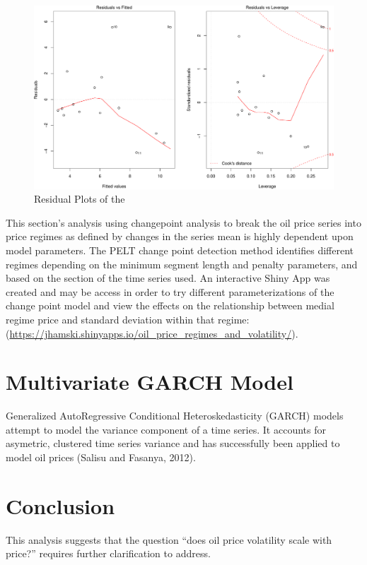 \documentclass[]{article}
\begin{document}
\begin{figure}[htbp]
\centering
\includegraphics{Figs/unnamed-chunk-18-1.pdf}
\caption{Residual Plots of the}
\end{figure}

This section's analysis using changepoint analysis to break the oil
price series into price regimes as defined by changes in the series mean
is highly dependent upon model parameters. The PELT change point
detection method identifies different regimes depending on the minimum
segment length and penalty parameters, and based on the section of the
time series used. An interactive Shiny App was created and may be access
in order to try different parameterizations of the change point model
and view the effects on the relationship between medial regime price and
standard deviation within that regime:
(\url{https://jhamski.shinyapps.io/oil_price_regimes_and_volatility/}).

\section{Multivariate GARCH Model}\label{multivariate-garch-model}

Generalized AutoRegressive Conditional Heteroskedasticity (GARCH) models
attempt to model the variance component of a time series. It accounts
for asymetric, clustered time series variance and has successfully been
applied to model oil prices (Salisu and Fasanya, 2012).

\section{Conclusion}\label{conclusion}

This analysis suggests that the question ``does oil price volatility
scale with price?'' requires further clarification to address.
\end{document}
